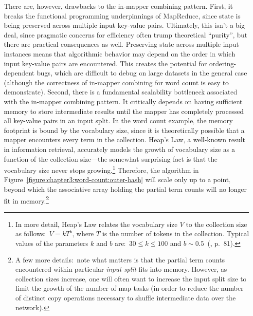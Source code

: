 There are, however, drawbacks to the in-mapper combining pattern.
First, it breaks the functional programming underpinnings of
MapReduce, since state is being preserved across multiple input
key-value pairs.  Ultimately, this isn't a big deal, since pragmatic
concerns for efficiency often trump theoretical ``purity'', but there
are practical consequences as well.  Preserving state across multiple
input instances means that algorithmic behavior may depend on the
order in which input key-value pairs are encountered.  This creates
the potential for ordering-dependent bugs, which are difficult to
debug on large datasets in the general case (although the correctness
of in-mapper combining for word count is easy to demonstrate).
Second, there is a fundamental scalability bottleneck associated with
the in-mapper combining pattern.  It critically depends on having
sufficient memory to store intermediate results until the mapper has
completely processed all key-value pairs in an input split.  In the
word count example, the memory footprint is bound by the vocabulary
size, since it is theoretically possible that a mapper encounters
every term in the collection.  Heap's Law, a well-known result in
information retrieval, accurately models the growth of vocabulary size
as a function of the collection size---the somewhat surprising fact is
that the vocabulary size never stops growing.\footnote{In more detail,
  Heap's Law relates the vocabulary size $V$ to the collection size as
  follows:\ $V =kT^b$, where $T$ is the number of tokens in the
  collection.  Typical values of the parameters $k$ and $b$ are:\ $30
  \leq k \leq 100$ and $b \sim 0.5$~(\cite{Manning_etal_2008},
  p.\ 81).}  Therefore, the algorithm in
Figure~\ref{figure:chapter3:word-count:outer-hash} will scale only up
to a point, beyond which the associative array holding the partial
term counts will no longer fit in memory.\footnote{A few more
  details:\ note what matters is that the partial term counts
  encountered within particular {\it input split} fits into memory.
  However, as collection sizes increase, one will often want to
  increase the input split size to limit the growth of the number of
  map tasks (in order to reduce the number of distinct copy operations
  necessary to shuffle intermediate data over the network).}

